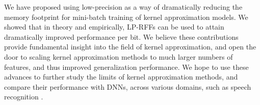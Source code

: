 We have proposed using low-precision as a way of dramatically reducing the memory footprint for mini-batch training of kernel approximation models. We showed that in theory and empirically, LP-RFFs can be used to attain dramatically improved performance per bit.  We believe these contributions provide fundamental insight into the field of kernel approximation, and open the door to scaling kernel approximation methods to much larger numbers of features, and thus improved generalization performance. We hope to use these advances to further study the limits of kernel approximation methods, and compare their performance with DNNs, across various domains, such as speech recognition \citep{may2017}.

